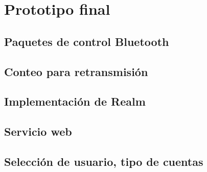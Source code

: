 \chapter{Prototipo final}\label{protof}


\section{Paquetes de control Bluetooth}



\section{Conteo para retransmisión}



\section{Implementación de Realm}



\section{Servicio web}



\section{Selección de usuario, tipo de cuentas}

